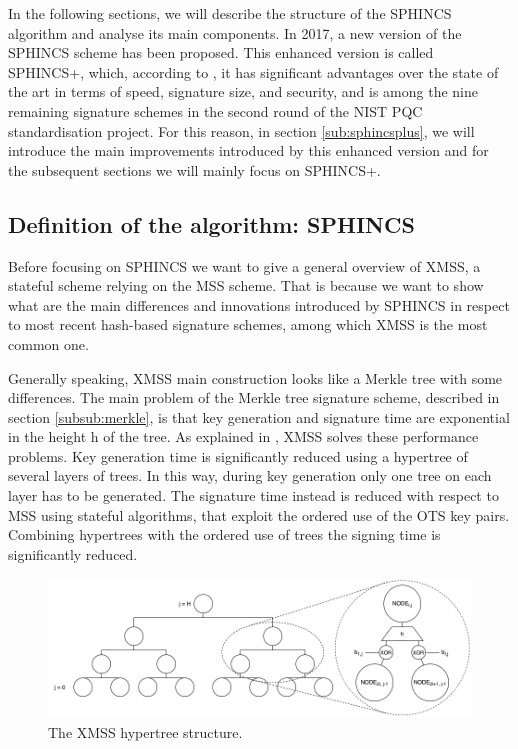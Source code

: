 \documentclass[a4paper,12pt]{article}
\begin{document}
In the following sections, we will describe the structure of the SPHINCS algorithm and analyse its main components.
In 2017, a new version of the SPHINCS scheme has been proposed. This enhanced version is called SPHINCS+, which, according to \cite{3_SPHINCS_secondpaper}, it has significant advantages over the state of the art in terms of speed, signature size, and security, and is among the nine remaining signature schemes in the second round of the NIST PQC standardisation project. For this reason, in section \ref{sub:sphincsplus}, we will introduce the main improvements introduced by this enhanced version and for the subsequent sections we will mainly focus on SPHINCS+.


\subsection{Definition of the algorithm: SPHINCS}
\label{sub:def}

Before focusing on SPHINCS we want to give a general overview of XMSS, a stateful scheme relying on the MSS scheme. That is because we want to show what are the main differences and innovations introduced by SPHINCS in respect to most recent hash-based signature schemes, among which XMSS is the most common one.

Generally speaking, XMSS main construction looks like a Merkle tree with some differences.
The main problem of the Merkle tree signature scheme, described in section \ref{subsub:merkle}, is that key generation and signature time are exponential in the height h of the tree. As explained in \cite{1_sphincspaper}, XMSS solves these performance problems. Key generation time is significantly reduced using a hypertree of several layers of trees. In this way, during key generation only one tree on each layer has to be generated. The signature time instead is reduced with respect to MSS using stateful algorithms, that exploit the ordered use of the OTS key pairs. Combining hypertrees with the ordered use of trees the signing time is significantly reduced.


\begin{figure}
\centerline{\includegraphics[scale=0.5]{img/xmss.png}}
\caption{The XMSS hypertree structure.}
\label{fig:xmss}
\end{figure}
\end{document}
